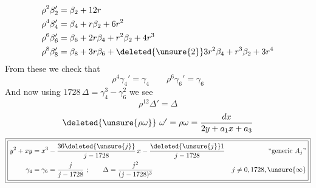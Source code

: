 \[
\begin{aligned}
\rho^2\beta_2'&=\beta_2+12r\\
\rho^4\beta_4'&=\beta_4+r\beta_2+6r^2\\
\rho^6\beta_6'&=\beta_6+2r\beta_4+r^2\beta_2+4r^3\\
\rho^8\beta_8'&=\beta_8+3r\beta_6+\deleted{\unsure{2}}3r^2\beta_4+r^3\beta_2+3r^4
\end{aligned}
\]
From these we check that
\[
\rho^4\gamma_4'=\gamma_4\qquad\rho^6\gamma_6'=\gamma_6
\]
And now using $1728\,\Delta=\gamma_4^3-\gamma_6^2$ we see
\[
\rho^{12}\Delta'=\Delta
\]
\[
\deleted{\unsure{\rho\omega}}\ \omega'=\rho\omega=\frac{dx}{2y+a_1x+a_3}
\]
\[
\boxed{\boxed{\begin{aligned}
y^2+xy&=x^3-\frac{36\deleted{\unsure{j}}}{j-1728}\,x
-\frac{\deleted{\unsure{j}}1}{j-1728}
&\text{\textquotedblleft generic }A_j\text{\textquotedblright}\\
\gamma_4&=\gamma_6=\frac{j}{j-1728}\ ;\qquad
\Delta=\frac{j^2}{(j-1728)^3}
&j\ne0,1728,\unsure{\infty}
\end{aligned}}}
\]

